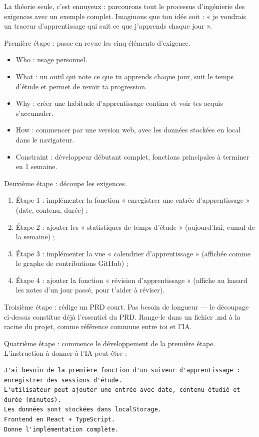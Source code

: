 La théorie seule, c'est ennuyeux : parcourons tout le processus d'ingénierie des exigences avec un exemple complet. Imaginons que ton idée soit : « je voudrais un traceur d'apprentissage qui suit ce que j'apprends chaque jour ».

Première étape : passe en revue les cinq éléments d'exigence.

\begin{itemize}
  \item Who : usage personnel.
  \item What : un outil qui note ce que tu apprends chaque jour, suit le temps d'étude et permet de revoir ta progression.
  \item Why : créer une habitude d'apprentissage continu et voir tes acquis s'accumuler.
  \item How : commencer par une version web, avec les données stockées en local dans le navigateur.
  \item Constraint : développeur débutant complet, fonctions principales à terminer en 1 semaine.
\end{itemize}

Deuxième étape : découpe les exigences.

\begin{enumerate}
  \item Étape 1 : implémenter la fonction « enregistrer une entrée d'apprentissage » (date, contenu, durée) ;
  \item Étape 2 : ajouter les « statistiques de temps d'étude » (aujourd'hui, cumul de la semaine) ;
  \item Étape 3 : implémenter la vue « calendrier d'apprentissage » (affichée comme le graphe de contributions GitHub) ;
  \item Étape 4 : ajouter la fonction « révision d'apprentissage » (affiche au hasard les notes d'un jour passé, pour t'aider à réviser).
\end{enumerate}

Troisième étape : rédige un PRD court. Pas besoin de longueur — le découpage ci-dessus constitue déjà l'essentiel du PRD. Range-le dans un fichier .md à la racine du projet, comme référence commune entre toi et l'IA.

Quatrième étape : commence le développement de la première étape. L'instruction à donner à l'IA peut être :

\begin{lstlisting}
J'ai besoin de la première fonction d'un suiveur d'apprentissage : enregistrer des sessions d'étude.
L'utilisateur peut ajouter une entrée avec date, contenu étudié et durée (minutes).
Les données sont stockées dans localStorage.
Frontend en React + TypeScript.
Donne l'implémentation complète.
\end{lstlisting}

